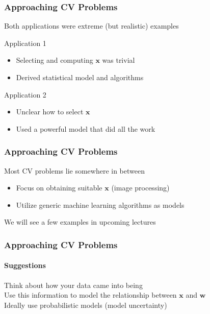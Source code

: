 \documentclass[xetex,professionalfont]{beamer}
\renewcommand{\vec}[1]{\ensuremath{\mathbf{#1}}}
\newcommand{\vw}{\vec{w}}
\newcommand{\vx}{\vec{x}}
\begin{document}
\begin{frame}
\frametitle{Approaching CV Problems}

Both applications were extreme (but realistic) examples

\bigskip
Application 1
\begin{itemize}
    \item Selecting and computing $\vx$ was trivial
    \item Derived statistical model and algorithms %
\end{itemize}

\bigskip
Application 2
\begin{itemize}
    \item Unclear how to select $\vx$
    \item Used a powerful model that did all the work
\end{itemize}

\end{frame}


\begin{frame}
\frametitle{Approaching CV Problems}

Most CV problems lie somewhere in between
\begin{itemize}
    \item Focus on obtaining suitable $\vx$ (image processing)
    \item Utilize generic machine learning algorithms as models
\end{itemize}

\bigskip
We will see a few examples in upcoming lectures

\end{frame}


\begin{frame}
\frametitle{Approaching CV Problems}
\framesubtitle{Suggestions}

Think about how your data came into being \\\medskip
Use this information to model the relationship between $\vx$ and $\vw$ \\\medskip
Ideally use probabilistic models (model uncertainty)

\end{frame}

\end{document}
